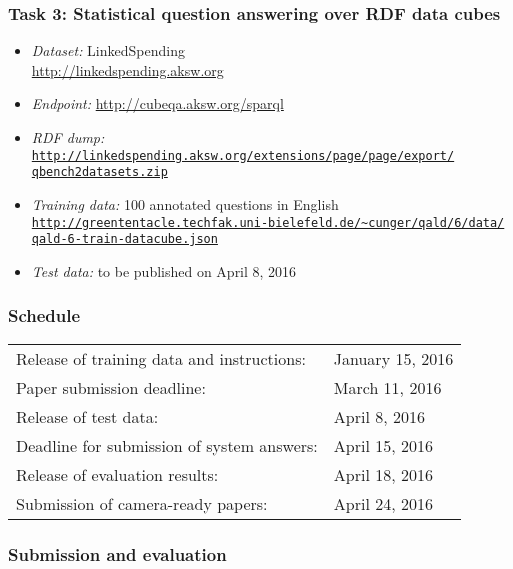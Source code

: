 \documentclass[a4paper]{article}
\begin{document}
{\subsubsection*{Task 3: Statistical question answering over RDF data cubes}
\begin{itemize}
\item \emph{Dataset:} LinkedSpending\\ \url{http://linkedspending.aksw.org}
\item \emph{Endpoint:} \url{http://cubeqa.aksw.org/sparql}
\item \emph{RDF dump:} \\ \href{http://linkedspending.aksw.org/extensions/page/page/export/qbench2datasets.zip}{\texttt{http://linkedspending.aksw.org/extensions/page/page/export/\\qbench2datasets.zip}}
\item \emph{Training data:} 100 annotated questions in English \\
\href{http://greententacle.techfak.uni-bielefeld.de/~cunger/qald/6/data/qald-6-train-datacube.json}{\texttt{http://greententacle.techfak.uni-bielefeld.de/\textasciitilde cunger/qald/6/data/\\qald-6-train-datacube.json}}
\item \emph{Test data:} to be published on April 8, 2016
\end{itemize}

\subsubsection*{Schedule}

\begin{tabular}{ll}
Release of training data and instructions: & January 15, 2016\\
Paper submission deadline: & March 11, 2016\\
Release of test data: & April 8, 2016\\
Deadline for submission of system answers: & April 15, 2016 \\
Release of evaluation results: & April 18, 2016 \\
Submission of camera-ready papers: & April 24, 2016 \\
\end{tabular}

\subsubsection*{Submission and evaluation}

}
\end{document}
